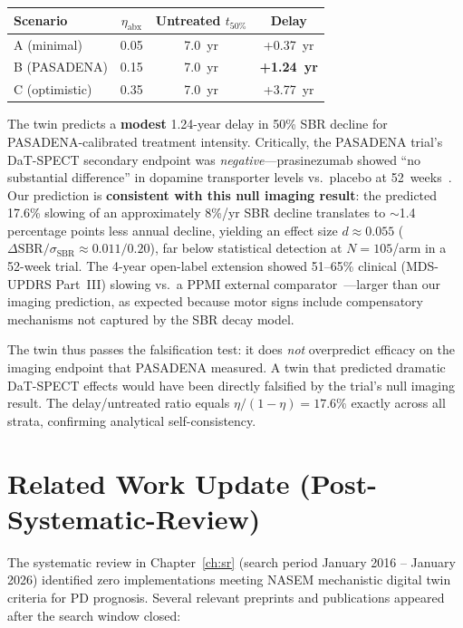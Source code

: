 \begin{center}
\small
\begin{tabular}{lccc}
\toprule
\textbf{Scenario} & $\eta_\text{abx}$ & \textbf{Untreated $t_{50\%}$} & \textbf{Delay} \\
\midrule
A (minimal) & 0.05 & 7.0~yr & +0.37~yr \\
B (PASADENA) & 0.15 & 7.0~yr & \textbf{+1.24~yr} \\
C (optimistic) & 0.35 & 7.0~yr & +3.77~yr \\
\bottomrule
\end{tabular}
\end{center}

The twin predicts a \textbf{modest} 1.24-year delay in 50\% SBR decline for PASADENA-calibrated treatment intensity. Critically, the PASADENA trial's DaT-SPECT secondary endpoint was \emph{negative}---prasinezumab showed ``no substantial difference'' in dopamine transporter levels vs.\ placebo at 52~weeks~\cite{pagano2022}. Our prediction is \textbf{consistent with this null imaging result}: the predicted 17.6\% slowing of an approximately 8\%/yr SBR decline translates to $\sim$1.4 percentage points less annual decline, yielding an effect size $d \approx 0.055$ ($\Delta\text{SBR}/\sigma_\text{SBR} \approx 0.011/0.20$), far below statistical detection at $N=105$/arm in a 52-week trial. The 4-year open-label extension showed 51--65\% clinical (MDS-UPDRS Part~III) slowing vs.\ a PPMI external comparator~\cite{pagano2024}---larger than our imaging prediction, as expected because motor signs include compensatory mechanisms not captured by the SBR decay model.

The twin thus passes the falsification test: it does \emph{not} overpredict efficacy on the imaging endpoint that PASADENA measured. A twin that predicted dramatic DaT-SPECT effects would have been directly falsified by the trial's null imaging result. The delay/untreated ratio equals $\eta/(1-\eta) = 17.6\%$ exactly across all strata, confirming analytical self-consistency.


\section{Related Work Update (Post-Systematic-Review)}
\label{sec:mech-related-work}

The systematic review in Chapter~\ref{ch:sr} (search period January 2016 -- January 2026) identified zero implementations meeting NASEM mechanistic digital twin criteria for PD prognosis. Several relevant preprints and publications appeared after the search window closed:

